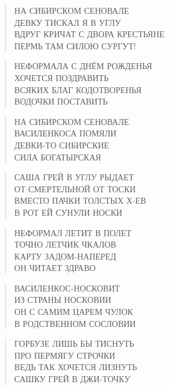 \poemtitle{***}
\begin{verse}
НА СИБИРСКОМ СЕНОВАЛЕ\\
ДЕВКУ ТИСКАЛ  Я В УГЛУ\\
ВДРУГ КРИЧАТ С ДВОРА КРЕСТЬЯНЕ\\
ПЕРМЬ ТАМ СИЛОЮ СУРГУТ!
\end{verse}

\poemtitle{***}
\begin{verse}
НЕФОРМАЛА С ДНЁМ РОЖДЕНЬЯ\\
ХОЧЕТСЯ ПОЗДРАВИТЬ\\
ВСЯКИХ БЛАГ КОДОТВОРЕНЬЯ\\
ВОДОЧКИ ПОСТАВИТЬ
\end{verse}

\poemtitle{***}
\begin{verse}
НА СИБИРСКОМ СЕНОВАЛЕ\\
ВАСИЛЕНКОСА ПОМЯЛИ\\
ДЕВКИ-ТО СИБИРСКИЕ\\
СИЛА БОГАТЫРСКАЯ
\end{verse}

\poemtitle{***}
\begin{verse}
САША ГРЕЙ В УГЛУ РЫДАЕТ\\
ОТ СМЕРТЕЛЬНОЙ ОТ ТОСКИ\\
ВМЕСТО ПАЧКИ ТОЛСТЫХ Х-ЕВ\\
В РОТ ЕЙ СУНУЛИ НОСКИ
\end{verse}

\poemtitle{***}
\begin{verse}
НЕФОРМАЛ ЛЕТИТ В ПОЛЕТ\\
ТОЧНО ЛЕТЧИК ЧКАЛОВ\\
КАРТУ ЗАДОМ-НАПЕРЕД\\
ОН ЧИТАЕТ ЗДРАВО
\end{verse}

\poemtitle{***}
\begin{verse}
ВАСИЛЕНКОС-НОСКОВИТ\\
ИЗ СТРАНЫ НОСКОВИИ\\
ОН С САМИМ ЦАРЕМ ЧУЛОК\\
В РОДСТВЕННОМ СОСЛОВИИ
\end{verse}

\poemtitle{***}
\begin{verse}
ГОРБУЗЕ ЛИШЬ БЫ ТИСНУТЬ\\
ПРО ПЕРМЯГУ СТРОЧКИ\\
ВЕДЬ ТАК ХОЧЕТСЯ ЛИЗНУТЬ\\
САШКУ ГРЕЙ В ДЖИ-ТОЧКУ
\end{verse}

